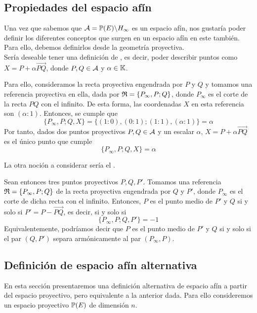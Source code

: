 \subsection{Propiedades del espacio afín}
Una vez que sabemos que $\mathcal{A}=\mathbb{P}(E)\backslash H_\infty$ es un espacio afín, nos gustaría poder definir los diferentes conceptos que surgen en un espacio afín en este también. Para ello, debemos definirlos desde la geometría proyectiva.\\

Sería deseable tener una definición de , es decir, poder describir puntos como $X=P+\alpha\overrightarrow{PQ}$, donde $P,Q\in\mathcal{A}$ y $\alpha\in\mathbb{K}$.

Para ello, consideramos la recta proyectiva engendrada por $P$ y $Q$ y tomamos una referencia proyectiva en ella, dada por $\mathfrak{R}=\{P_\infty,P;Q\}$, donde $P_\infty$ es el corte de la recta $PQ$ con el infinito. De esta forma, las coordenadas $X$ en esta referencia son $(\alpha:1)$. Entonces, se cumple que
\begin{equation*}
	\{P_\infty,P;Q,X\}=\{(1:0),(0:1);(1:1),(\alpha:1)\}=\alpha
\end{equation*}
Por tanto, dados dos puntos proyectivos $P,Q\in\mathcal{A}$ y un escalar $\alpha$, $X=P+\alpha\overrightarrow{PQ}$ es el único punto que cumple
\[\{P_\infty,P;Q,X\}=\alpha\]

La otra noción a considerar sería el .

Sean entonces tres puntos proyectivos $P,Q,P'$. Tomamos una referencia $\mathfrak{R}=\{P_\infty,P;Q\}$ de la recta proyectiva engendrada por $Q$ y $P'$, donde $P_\infty$ es el corte de dicha recta con el infinito. Entonces, $P$ es el punto medio de $P'$ y $Q$ si y solo si $P'=P-\overrightarrow{PQ}$, es decir, si y solo si
\begin{equation}
	\{P_\infty,P;Q,P'\}=-1
\end{equation}
Equivalentemente, podríamos decir que $P$ es el punto medio de $P'$ y $Q$ si y solo si el par $(Q,P')$ separa armónicamente al par $(P_\infty,P)$.
\subsection{Definición de espacio afín alternativa}
En esta sección presentaremos una definición alternativa de espacio afín a partir del espacio proyectivo, pero equivalente a la anterior dada. Para ello consideremos un espacio proyectivo $\mathbb{P}(E)$ de dimensión $n$.\\

